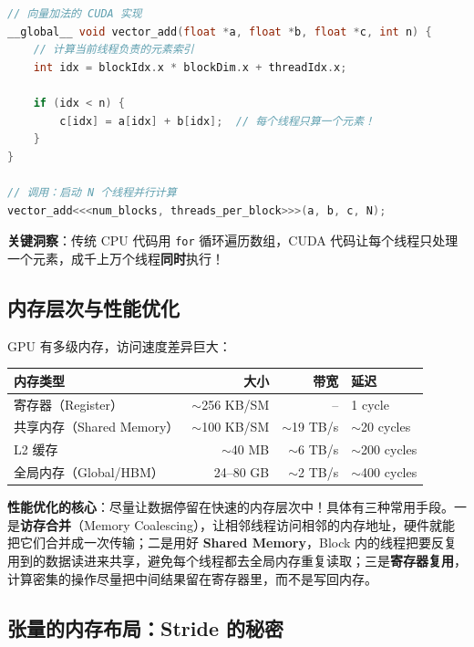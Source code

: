 \begin{lstlisting}[style=teaching, language=C]
// 向量加法的 CUDA 实现
__global__ void vector_add(float *a, float *b, float *c, int n) {
    // 计算当前线程负责的元素索引
    int idx = blockIdx.x * blockDim.x + threadIdx.x;
    
    if (idx < n) {
        c[idx] = a[idx] + b[idx];  // 每个线程只算一个元素！
    }
}

// 调用：启动 N 个线程并行计算
vector_add<<<num_blocks, threads_per_block>>>(a, b, c, N);
\end{lstlisting}

\textbf{关键洞察}：传统 CPU 代码用 \texttt{for} 循环遍历数组，CUDA 代码让每个线程只处理一个元素，成千上万个线程\textbf{同时}执行！

\subsection*{内存层次与性能优化}

GPU 有多级内存，访问速度差异巨大：

\begin{center}
\renewcommand{\arraystretch}{1.4}
\begin{tabular}{l|r|r|l}
\toprule
\textbf{内存类型} & \textbf{大小} & \textbf{带宽} & \textbf{延迟} \\
\midrule
寄存器（Register） & $\sim$256 KB/SM & -- & 1 cycle \\
共享内存（Shared Memory） & $\sim$100 KB/SM & $\sim$19 TB/s & $\sim$20 cycles \\
L2 缓存 & $\sim$40 MB & $\sim$6 TB/s & $\sim$200 cycles \\
全局内存（Global/HBM） & 24--80 GB & $\sim$2 TB/s & $\sim$400 cycles \\
\bottomrule
\end{tabular}
\end{center}


\textbf{性能优化的核心}：尽量让数据停留在快速的内存层次中！具体有三种常用手段。一是\textbf{访存合并}（Memory Coalescing），让相邻线程访问相邻的内存地址，硬件就能把它们合并成一次传输；二是用好 \textbf{Shared Memory}，Block 内的线程把要反复用到的数据读进来共享，避免每个线程都去全局内存重复读取；三是\textbf{寄存器复用}，计算密集的操作尽量把中间结果留在寄存器里，而不是写回内存。

\subsection*{张量的内存布局：Stride 的秘密}


